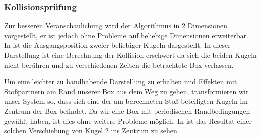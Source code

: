 \subsubsection{Kollisionsprüfung} %

\newcommand{\BoxW}{10}
\newcommand{\BoxH}{7}
\newcommand{\Kradius}{.7}

\newcommand{\Kx}{7}
\newcommand{\Ky}{6}

\newcommand{\vxa}{6/3}
\newcommand{\vya}{2/3}
\newcommand{\vxb}{-5/3}
\newcommand{\vyb}{3/3}

\newcommand{\Dx}{-2.5}
\newcommand{\Dy}{-5}

\newcommand{\BoxC}{\BoxW / 2 , \BoxH / 2}
\newcommand{\BoxWh}{\BoxW / 2}
\newcommand{\BoxHh}{\BoxH / 2}

\newcommand{\drawKugel}[1]{
    \draw[fill=black] 	(#1) circle (0.15em);
    \draw		(#1) circle (\Kradius);
}

\newcommand{\dis}{r_{21}}
\newcommand{\vdis}{\vec{r}_{21}}
\newcommand{\vdissq}{\left|\vdis\right|^2}

\newcommand{\vel}{v_{21}}
\newcommand{\vvel}{\vec{v}_{21}}
\newcommand{\vvelsq}{\left|\vvel\right|^2}
\newcommand{\dia}{d}

Zur besseren Veranschaulichung wird der Algorithmus in 2 Dimensionen vorgestellt, er ist jedoch ohne Probleme auf beliebige Dimensionen erweiterbar.\\
In  ist die Ausgangsposition zweier beliebiger Kugeln dargestellt. In dieser Darstellung ist eine Berechnung der Kollision erschwert da sich die beiden Kugeln nicht berühren und zu verschiedenen Zeiten die betrachtete Box verlassen.



Um eine leichter zu handhabende Darstellung zu erhalten und Effekten mit Stoßpartnern am Rand unserer Box aus dem Weg zu gehen, transformieren wir unser System so, dass sich eine der am berechneten Stoß beteiligten Kugeln im Zentrum der Box befindet. Da wir eine Box mit periodischen Randbedingungen gewählt haben, ist dies ohne weitere Probleme möglich. In  ist das Resultat einer solchen Verschiebung von Kugel 2 ins Zentrum zu sehen.

